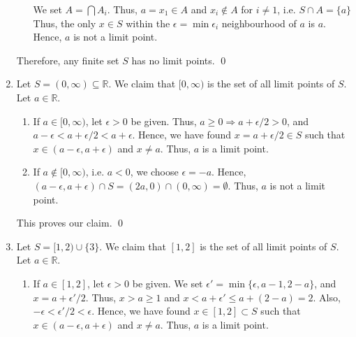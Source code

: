 \documentclass[10pt]{article}
\begin{document}
\begin{enumerate}
\begin{enumerate}
                        We set $A = \bigcap A_i$.
                        Thus, $a = x_1 \in A$ and $x_i \notin A$ for $i \neq 1$, i.e. $S \cap A = \{a\}$
                        Thus, the only $x \in S$ within the $\epsilon = \min \epsilon_i$ neighbourhood of $a$
                        is $a$.
                        Hence, $a$ is not a limit point.
                \end{enumerate}
                Therefore, any finite set $S$ has no limit points. \qed

                \item Let $S = (0, \infty) \subseteq \mathbb{R}$. We claim that $[0, \infty)$ is the set of all limit points of $S$.
                Let $a \in \mathbb{R}$.
                \begin{enumerate}
                        \item If $a \in [0, \infty)$, let $\epsilon > 0$ be given. Thus, $a \ge 0 \Rightarrow a + \epsilon/2 > 0$,
                        and $a - \epsilon < a + \epsilon/2 < a + \epsilon$.
                        Hence, we have found $x = a + \epsilon/2 \in S$ such that $x \in (a - \epsilon, a + \epsilon)$ and $x \neq a$.
                        Thus, $a$ is a limit point.
                        
                        \item If $a \notin [0, \infty)$, i.e. $a < 0$, we choose $\epsilon = -a$. Hence, $(a - \epsilon, a + \epsilon) \cap
                        S = (2a, 0) \cap (0, \infty) = \emptyset$. Thus, $a$ is not a limit point.
                \end{enumerate}
                This proves our claim. \qed

                \item Let $S = [1, 2) \cup \{3\}$. We claim that $[1, 2]$ is the set of all limit points of $S$.
                Let $a \in \mathbb{R}$.
                \begin{enumerate}
                        \item If $a \in [1, 2]$, let $\epsilon > 0$ be given. We set $\epsilon' = \min\{\epsilon, a - 1, 2 - a\}$, and
                        $x = a + \epsilon'/2$. Thus, $x > a \ge 1$ and $x < a + \epsilon' \le a + (2 - a) = 2$.
                        Also, $-\epsilon < \epsilon'/2 < \epsilon$.
                        Hence, we have found $x \in [1, 2] \subset S$ such that $x \in (a - \epsilon, a + \epsilon)$ and
                        $x \neq a$. Thus, $a$ is a limit point.


\end{enumerate}
\end{enumerate}
\end{document}

